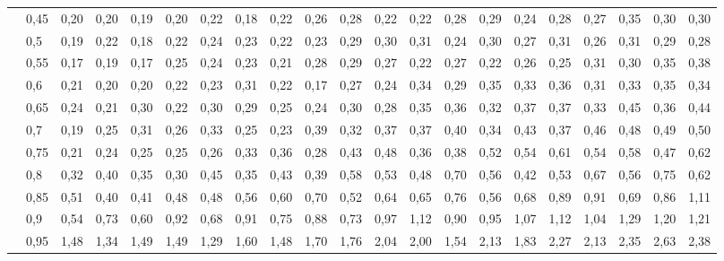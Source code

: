 \documentclass[a4paper,12pt]{article}
\theoremstyle{plain}
\begin{document}
\begin{landscape}
\begin{table}[H]
{\begin{tabular}{rl||ccccccccccccccccccc}
          & 0,45  & 0,20  & 0,20  & 0,19  & 0,20  & 0,22  & 0,18  & 0,22  & 0,26  & 0,28  & 0,22  & 0,22  & 0,28  & 0,29  & 0,24  & 0,28  & 0,27  & 0,35  & 0,30  & 0,30 \\
          & 0,5   & 0,19  & 0,22  & 0,18  & 0,22  & 0,24  & 0,23  & 0,22  & 0,23  & 0,29  & 0,30  & 0,31  & 0,24  & 0,30  & 0,27  & 0,31  & 0,26  & 0,31  & 0,29  & 0,28 \\
          & 0,55  & 0,17  & 0,19  & 0,17  & 0,25  & 0,24  & 0,23  & 0,21  & 0,28  & 0,29  & 0,27  & 0,22  & 0,27  & 0,22  & 0,26  & 0,25  & 0,31  & 0,30  & 0,35  & 0,38 \\
          & 0,6   & 0,21  & 0,20  & 0,20  & 0,22  & 0,23  & 0,31  & 0,22  & 0,17  & 0,27  & 0,24  & 0,34  & 0,29  & 0,35  & 0,33  & 0,36  & 0,31  & 0,33  & 0,35  & 0,34 \\
          & 0,65  & 0,24  & 0,21  & 0,30  & 0,22  & 0,30  & 0,29  & 0,25  & 0,24  & 0,30  & 0,28  & 0,35  & 0,36  & 0,32  & 0,37  & 0,37  & 0,33  & 0,45  & 0,36  & 0,44 \\
          & 0,7   & 0,19  & 0,25  & 0,31  & 0,26  & 0,33  & 0,25  & 0,23  & 0,39  & 0,32  & 0,37  & 0,37  & 0,40  & 0,34  & 0,43  & 0,37  & 0,46  & 0,48  & 0,49  & 0,50 \\
          & 0,75  & 0,21  & 0,24  & 0,25  & 0,25  & 0,26  & 0,33  & 0,36  & 0,28  & 0,43  & 0,48  & 0,36  & 0,38  & 0,52  & 0,54  & 0,61  & 0,54  & 0,58  & 0,47  & 0,62 \\
          & 0,8   & 0,32  & 0,40  & 0,35  & 0,30  & 0,45  & 0,35  & 0,43  & 0,39  & 0,58  & 0,53  & 0,48  & 0,70  & 0,56  & 0,42  & 0,53  & 0,67  & 0,56  & 0,75  & 0,62 \\
          & 0,85  & 0,51  & 0,40  & 0,41  & 0,48  & 0,48  & 0,56  & 0,60  & 0,70  & 0,52  & 0,64  & 0,65  & 0,76  & 0,56  & 0,68  & 0,89  & 0,91  & 0,69  & 0,86  & 1,11 \\
          & 0,9   & 0,54  & 0,73  & 0,60  & 0,92  & 0,68  & 0,91  & 0,75  & 0,88  & 0,73  & 0,97  & 1,12  & 0,90  & 0,95  & 1,07  & 1,12  & 1,04  & 1,29  & 1,20  & 1,21 \\
          & 0,95  & 1,48  & 1,34  & 1,49  & 1,49  & 1,29  & 1,60  & 1,48  & 1,70  & 1,76  & 2,04  & 2,00  & 1,54  & 2,13  & 1,83  & 2,27  & 2,13  & 2,35  & 2,63  & 2,38 \\
    \end{tabular}%
  \label{tab:addlabel}%
  }
\end{table}%
\end{landscape}
\end{document}

